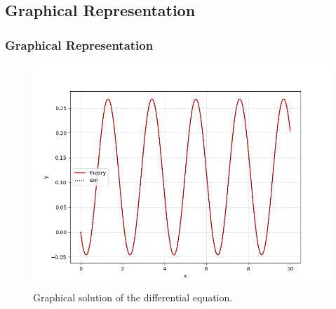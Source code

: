 \documentclass{beamer}
\numberwithin{equation}{section}
\begin{document}
\subsection{Graphical Representation}
\begin{frame}
\frametitle{Graphical Representation}
\begin{figure}[h]
    \centering
    \includegraphics[width=\columnwidth]{figs/fig.png}
    \caption{Graphical solution of the differential equation.}
\end{figure}
\end{frame}
\end{document}
